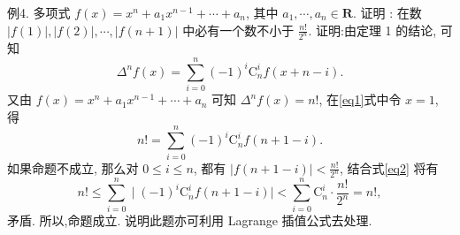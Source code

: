 例4. 多项式 $f(x)=x^n+a_1 x^{n-1}+\cdots+a_n$, 其中 $a_1, \cdots, a_n \in \mathbf{R}$. 证明 : 在数 $|f(1)|,|f(2)|, \cdots,|f(n+1)|$ 中必有一个数不小于 $\frac{n !}{2^n}$.
证明:由定理 1 的结论, 可知
$$
\Delta^n f(x)=\sum_{i=0}^n(-1)^i \mathrm{C}_n^i f(x+n-i) . \label{eq1}
$$
又由 $f(x)=x^n+a_1 x^{n-1}+\cdots+a_n$ 可知 $\Delta^n f(x)=n !$, 在\ref{eq1}式中令 $x=1$, 得
$$
n !=\sum_{i=0}^n(-1)^i \mathrm{C}_n^i f(n+1-i) . \label{eq2}
$$
如果命题不成立, 那么对 $0 \leqslant i \leqslant n$, 都有 $|f(n+1-i)|<\frac{n !}{2^n}$, 结合式\ref{eq2} 将有
$$
n ! \leqslant \sum_{i=0}^n \mid (-1)^i \mathrm{C}_n^i f(n+1-i) \mid<\sum_{i=0}^n \mathrm{C}_n^i \cdot \frac{n !}{2^n}=n !,
$$
矛盾.
所以,命题成立.
说明此题亦可利用 Lagrange 插值公式去处理.



